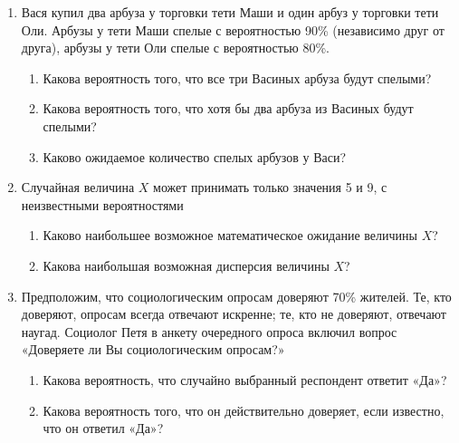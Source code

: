 \begin{enumerate}
\item Вася купил два арбуза у торговки тети Маши и один арбуз у торговки тети Оли. Арбузы у тети Маши спелые с вероятностью 90\% (независимо друг от друга), арбузы у тети Оли спелые с вероятностью 80\%.
\begin{enumerate}
\item Какова вероятность того, что все три Васиных арбуза будут спелыми?
\item Какова вероятность того, что хотя бы два арбуза из Васиных будут спелыми?
\item Каково ожидаемое количество спелых арбузов у Васи?
\end{enumerate}

\item Случайная величина $X$ может принимать только значения 5 и 9, с неизвестными вероятностями
\begin{enumerate}
\item Каково наибольшее возможное математическое ожидание величины $X$?
\item Какова наибольшая возможная дисперсия величины $X$?
\end{enumerate}



\item Предположим, что социологическим опросам доверяют 70\% жителей. Те, кто доверяют, опросам всегда отвечают искренне; те, кто не доверяют, отвечают наугад. Социолог Петя  в анкету очередного опроса включил вопрос «Доверяете ли Вы социологическим опросам?»
\begin{enumerate}
\item Какова вероятность, что случайно выбранный респондент ответит «Да»?
\item Какова вероятность того, что он действительно доверяет, если известно, что он ответил «Да»?
\end{enumerate}


\end{enumerate}
